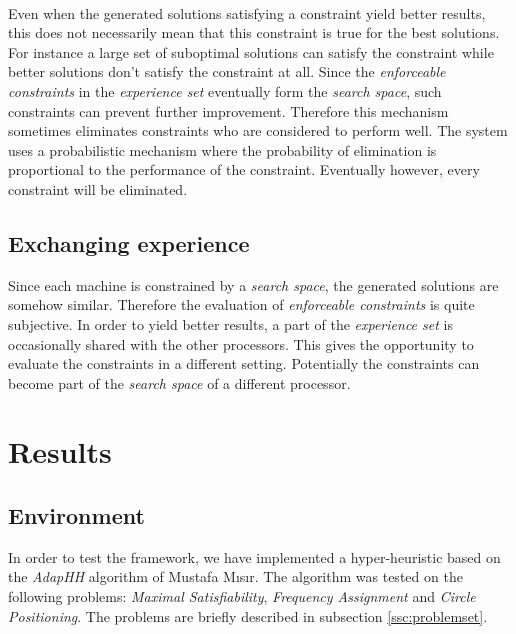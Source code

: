 \documentclass[a4paper,10pt]{article}
\newcommand{\seclab}[1]{\label{sec:#1}}
\newcommand{\sscref}[1]{\ref{ssc:#1}}
\theoremstyle{definition}
\begin{document}
\paragraph{}
Even when the generated solutions satisfying a constraint yield better results, this does not necessarily mean that this constraint is true for the best solutions. For instance a large set of suboptimal solutions can satisfy the constraint while better solutions don't satisfy the constraint at all. Since the \emph{enforceable constraints} in the \emph{experience set} eventually form the \emph{search space}, such constraints can prevent further improvement. Therefore this mechanism sometimes eliminates constraints who are considered to perform well. The system uses a probabilistic mechanism where the probability of elimination is proportional to the performance of the constraint. Eventually however, every constraint will be eliminated.%

\subsection{Exchanging experience}
\seclab{exchangingexperience}
Since each machine is constrained by a \emph{search space}, the generated solutions are somehow similar. Therefore the evaluation of \emph{enforceable constraints} is quite subjective. In order to yield better results, a part of the \emph{experience set} is occasionally shared with the other processors. This gives the opportunity to evaluate the constraints in a different setting. Potentially the constraints can become part of the \emph{search space} of a different processor.%

\section{Results}
\seclab{results}

\subsection{Environment}
In order to test the framework, we have implemented a hyper-heuristic based on the \emph{AdapHH}\cite{} algorithm of Mustafa M\i{}s\i{}r. The algorithm was tested on the following problems: \emph{Maximal Satisfiability}, \emph{Frequency Assignment} and \emph{Circle Positioning}. The problems are briefly described in subsection \sscref{problemset}.%
\end{document}

